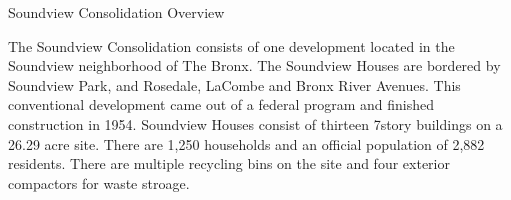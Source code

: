 Soundview Consolidation Overview

The Soundview Consolidation consists of one development located in the Soundview neighborhood of The Bronx. The Soundview Houses are bordered by Soundview Park, and Rosedale, LaCombe and Bronx River Avenues. This conventional development came out of a federal program and finished construction in 1954. Soundview Houses consist of thirteen 7story buildings on a 26.29 acre site. There are 1,250 households and an official population of 2,882 residents. There are multiple recycling bins on the site and four exterior compactors for waste stroage.